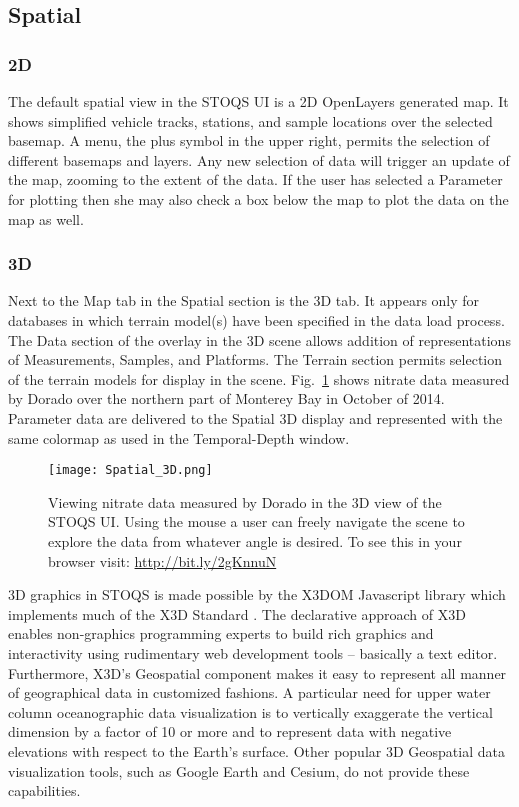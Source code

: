 \documentclass[conference]{IEEEtran}
\begin{document}
\subsection{Spatial}

\subsubsection{2D}
The default spatial view in the STOQS UI is a 2D OpenLayers generated map. It shows 
simplified vehicle tracks, stations, and sample locations over the selected basemap. A menu, the plus symbol
in the upper right, permits the selection of different basemaps and 
layers. Any new selection of data will trigger an update
of the map, zooming to the extent of the data. If the user has selected a Parameter for plotting
then she may also check a box below the map to plot the data on the map as well.

\subsubsection{3D}
Next to the Map tab in the Spatial section is the 3D tab. It appears 
only for databases in which terrain model(s) have been specified in the data load process. 
The Data section of
the overlay in the 3D scene allows addition of representations of Measurements,
Samples, and Platforms. The Terrain section permits selection of the terrain
models for display in the scene. Fig.~\ref{fig:Spatial_3D} shows nitrate data 
measured by Dorado over the northern part of Monterey Bay in October of 2014. 
Parameter data are delivered to the Spatial 3D display and represented with the same
colormap as used in the Temporal-Depth window.

\begin{figure}[htbp]
\centering
\texttt{[image: Spatial\_3D.png]}
\caption{Viewing nitrate data measured by Dorado in the 3D view of the STOQS UI.
Using the mouse a user can freely navigate the scene to explore the data from 
whatever angle is desired. To see this in your browser visit: \url{http://bit.ly/2gKnnuN}}
\label{fig:Spatial_3D}
\end{figure}

3D graphics in STOQS is made possible by the X3DOM Javascript library \cite{Behr:2010:SAH:1836049.1836077} 
which implements much of the X3D Standard \cite{x3d07}. The declarative approach of X3D
enables non-graphics programming experts to build rich graphics and interactivity 
using rudimentary web development tools -- basically a text editor. Furthermore, X3D's Geospatial component
\cite{Plesch:2015:XGC:2775292.2775315}
makes it easy to represent all manner of geographical data in customized fashions. 
A particular need for upper water column oceanographic data visualization is to
vertically exaggerate the vertical dimension by a factor of 10 or more and to
represent data with negative elevations with respect to the Earth's surface.
Other popular 3D Geospatial data visualization tools, such as Google Earth 
and Cesium, do not provide these capabilities.
\end{document}
